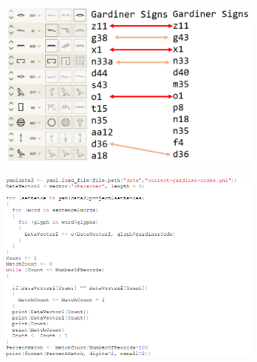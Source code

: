\documentclass[unknownkeysallowed,usepdftitle=false, parskip=full, aspectratio=1610]{beamer}
\newcommand{\secvariable}{nothing}
\begin{document}
\begin{frame}\label{\secvariable}

\begin{center}
\includegraphics[width=0.7\textwidth,keepaspectratio]{figure/almost.PNG}
\end{center}

\end{frame}



\begin{frame}\label{\secvariable}

\begin{center}
\includegraphics[width=0.7\textwidth,keepaspectratio]{figure/matches2.PNG}
\end{center}
\vfill

\end{frame}


\end{document}
